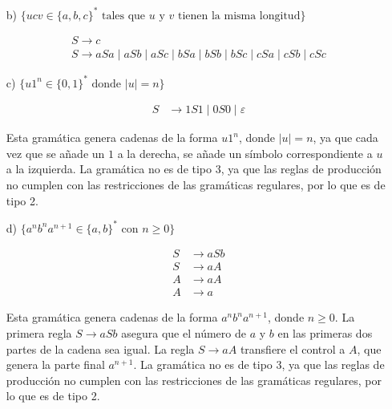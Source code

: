 \documentclass[12pt]{book} %
\begin{document}
\begin{ejercicio}
\begin{itemize}
\begin{itemize}
        \item[b)] $\{ucv \in \{a, b, c\}^* \text{ tales que } u \text{ y } v \text{ tienen la misma longitud}\}$
        
        \begin{solucion}[media.b]

        \begin{align*}
        S \rightarrow c \\
        S \rightarrow  aSa \mid aSb \mid aSc \mid bSa \mid bSb \mid bSc \mid cSa \mid cSb \mid cSc
        \end{align*}


        \end{solucion}

        \item[c)] $\{u1^n \in \{0, 1\}^* \text{ donde } |u| = n\}$
        

        \begin{solucion}[media.c]

        \begin{align*}
        S &\rightarrow 1S1 \mid 0S0 \mid \varepsilon
        \end{align*}

        Esta gramática genera cadenas de la forma $u1^n$, donde $|u| = n$, ya que cada vez que se añade un $1$ a la derecha, se añade un símbolo correspondiente a $u$ a la izquierda. La gramática no es de tipo 3, ya que las reglas de producción no cumplen con las restricciones de las gramáticas regulares, por lo que es de tipo 2.

        \end{solucion}

        
        \item[d)] $\{a^n b^n a^{n+1} \in \{a, b\}^* \text{ con } n \geq 0\}$


        \begin{solucion}[media.d]

        \begin{align*}
        S &\rightarrow aSb \\
        S &\rightarrow aA \\
        A &\rightarrow aA \\
        A &\rightarrow a
        \end{align*}

        Esta gramática genera cadenas de la forma $a^n b^n a^{n+1}$, donde $n \geq 0$. La primera regla $S \rightarrow aSb$ asegura que el número de $a$ y $b$ en las primeras dos partes de la cadena sea igual. La regla $S \rightarrow aA$ transfiere el control a $A$, que genera la parte final $a^{n+1}$. La gramática no es de tipo 3, ya que las reglas de producción no cumplen con las restricciones de las gramáticas regulares, por lo que es de tipo 2.


\end{solucion}
\end{itemize}
\end{itemize}
\end{ejercicio}
\end{document}

